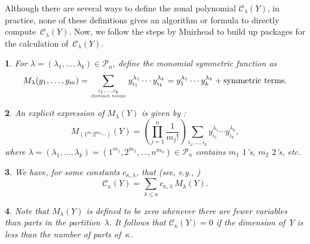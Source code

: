\documentclass[smallextended]{svjour3}
\newtheorem{thm}{\protect\theoremname}
\newtheorem{defn}[thm]{\protect\definitionname}
\newtheorem{rem}[thm]{\protect\remarkname}
\providecommand{\definitionname}{Definition}
\providecommand{\remarkname}{Remark}
\providecommand{\theoremname}{Theorem}
\begin{document}
Although there are several ways to define the zonal polynomial $\mathcal{C}_{\lambda}(Y)$,
in practice, none of these definitions gives an algorithm or formula
to directly compute~$\mathcal{C}_{\lambda}(Y)$. Now, we
follow the steps by Muirhead \cite{Muirhead} to build up packages for the
calculation of~$\mathcal{C}_{\lambda}(Y)$.
\begin{defn}
For $\lambda=(\lambda_1,\ldots,\lambda_k)\in\mathcal{P}_{n}$,
define the \emph{monomial symmetric function} as 
\begin{equation}
  M_{\lambda}(y_{1},\ldots,y_{m}) =
  \sum_{\genfrac{}{}{0pt}{}{i_{1},\ldots,i_{k}}{\text{distinct terms}}}y_{i_{1}}^{\lambda_{1}}\cdots y_{i_{k}}^{\lambda_{k}}=y_{1}^{\lambda_{1}}\cdots y_{k}^{\lambda_{k}}+\text{symmetric terms}.\label{eq:MZonal}
\end{equation}
\end{defn}
\begin{rem}
An explicit expression of $M_{\lambda}(Y)$ is given by
\cite[eq.~6]{Takemura}:
\begin{equation}\label{eq:MZonalComputation}
  M_{(1^{m_{1}}2^{m_{2}}\cdots)}(Y)=\left(\prod_{j=1}^{n}\frac{1}{m_{j}!}\right)
  \sum_{i_{1},\ldots,i_{k}}y_{i_{1}}^{\lambda_{1}}\cdots y_{i_{k}}^{\lambda_{k}},
\end{equation}
where $\lambda=(\lambda_1,\ldots,\lambda_k)=(1^{m_1},2^{m_2},\ldots,n^{m_n})\in\mathcal{P}_n$ contains $m_1$ $1$'s, $m_2$ $2$'s, etc. 
\end{rem}
\begin{thm}
We have,  for some constants $c_{\kappa,\lambda}$, that (see, e.g., \cite[eq.~13]{Muirhead})
\begin{equation}\label{eq:CInTermsOfM}
  \mathcal{C}_{\kappa}(Y)=\sum_{\lambda\leq\kappa}c_{\kappa,\lambda}\,M_{\lambda}(Y).
\end{equation}
\end{thm}
\begin{rem}\label{rem:polyzero}
  Note that $M_\lambda(Y)$ is defined to be zero whenever there are fewer
  variables than parts in the partition~$\lambda$. It follows that
  $\mathcal{C}_{\kappa}(Y)=0$ if the dimension of~$Y$ is less than the
  number of parts of~$\kappa$.
\end{rem}
\end{document}
